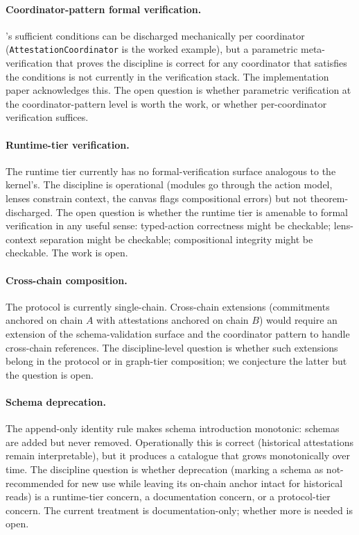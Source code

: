 \documentclass[11pt,a4paper]{article}
\theoremstyle{definition}
\theoremstyle{remark}
\begin{document}
\paragraph{Coordinator-pattern formal verification.}
's sufficient conditions can be discharged
mechanically per coordinator (\texttt{AttestationCoordinator} is the
worked example), but a parametric meta-verification that proves the
discipline is correct for any coordinator that satisfies the
conditions is not currently in the verification stack. The
implementation paper acknowledges this. The open question is
whether parametric verification at the coordinator-pattern level is
worth the work, or whether per-coordinator verification suffices.

\paragraph{Runtime-tier verification.}
The runtime tier currently has no formal-verification surface
analogous to the kernel's. The discipline is operational (modules
go through the action model, lenses constrain context, the canvas
flags compositional errors) but not theorem-discharged. The open
question is whether the runtime tier is amenable to formal
verification in any useful sense: typed-action correctness might
be checkable; lens-context separation might be checkable;
compositional integrity might be checkable. The work is open.

\paragraph{Cross-chain composition.}
The protocol is currently single-chain. Cross-chain extensions
(commitments anchored on chain $A$ with attestations anchored on
chain $B$) would require an extension of the schema-validation
surface and the coordinator pattern to handle cross-chain
references. The discipline-level question is whether such
extensions belong in the protocol or in graph-tier composition; we
conjecture the latter but the question is open.

\paragraph{Schema deprecation.}
The append-only identity rule makes schema introduction monotonic:
schemas are added but never removed. Operationally this is correct
(historical attestations remain interpretable), but it produces a
catalogue that grows monotonically over time. The discipline
question is whether deprecation (marking a schema as not-recommended
for new use while leaving its on-chain anchor intact for historical
reads) is a runtime-tier concern, a documentation concern, or a
protocol-tier concern. The current treatment is documentation-only;
whether more is needed is open.
\end{document}
